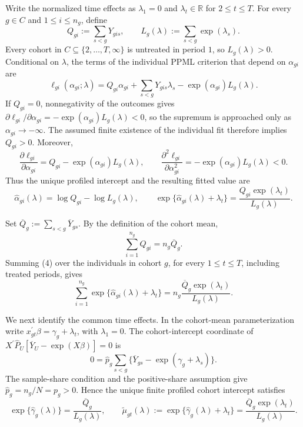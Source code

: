 Write the normalized time effects as \(\lambda _1=0\) and \(\lambda_t\in\mathbb R\) for \(2\le t\le T\).  For every \(g\in C\) and \(1\le i\le n_g\), define
\[
Q_{gi}:=\sum_{s<g}Y_{gis},
\qquad
L_g(\lambda):=\sum_{s<g}\exp(\lambda_s).
\tag{1}
\]
Every cohort in \(C\subseteq\{2,\ldots,T,\infty\}\) is untreated in period \(1\), so \(L_g(\lambda)>0\).  Conditional on \(\lambda\), the terms of the individual PPML criterion that depend on \(\alpha_{gi}\) are
\[
\ell_{gi}(\alpha_{gi};\lambda)
=Q_{gi}\alpha_{gi}
+\sum_{s<g}Y_{gis}\lambda_s
-\exp(\alpha_{gi})L_g(\lambda).
\tag{2}
\]
If \(Q_{gi}=0\), nonnegativity of the outcomes gives
\(\partial\ell_{gi}/\partial\alpha_{gi}=-\exp(\alpha_{gi})L_g(\lambda)<0\), so the supremum is approached only as \(\alpha_{gi}\to-\infty\).  The assumed finite existence of the individual fit therefore implies \(Q_{gi}>0\).  Moreover,
\[
\frac{\partial\ell_{gi}}{\partial\alpha_{gi}}
=Q_{gi}-\exp(\alpha_{gi})L_g(\lambda),
\qquad
\frac{\partial^2\ell_{gi}}{\partial\alpha_{gi}^2}
=-\exp(\alpha_{gi})L_g(\lambda)<0.
\tag{3}
\]
Thus the unique profiled intercept and the resulting fitted value are
\[
\widehat\alpha_{gi}(\lambda)
=\log Q_{gi}-\log L_g(\lambda),
\qquad
\exp\{\widehat\alpha_{gi}(\lambda)+\lambda_t\}
=\frac{Q_{gi}\exp(\lambda_t)}{L_g(\lambda)}.
\tag{4}
\]

Set \(\overline Q_g:=\sum_{s<g}\overline Y_{gs}\).  By the definition of the cohort mean,
\[
\sum_{i=1}^{n_g}Q_{gi}=n_g\overline Q_g.
\tag{5}
\]
Summing (4) over the individuals in cohort \(g\), for every \(1\le t\le T\), including treated periods, gives
\[
\sum_{i=1}^{n_g}
\exp\{\widehat\alpha_{gi}(\lambda)+\lambda_t\}
=n_g\frac{\overline Q_g\exp(\lambda_t)}{L_g(\lambda)}.
\tag{6}
\]

We next identify the common time effects.  In the cohort-mean parameterization write \(x_{gt}^{\prime}\beta=\gamma_g+\lambda_t\), with \(\lambda_1=0\).  The cohort-intercept coordinate of
\(X^{\prime}\widehat P_U[\overline Y_U-\exp(X\beta)]=0\) is
\[
0=\widehat p_g\sum_{s<g}
\{\overline Y_{gs}-\exp(\gamma_g+\lambda_s)\}.
\tag{7}
\]
The sample-share condition and the positive-share assumption give
\(\widehat p_g=n_g/N=p_g>0\).  Hence the unique finite profiled cohort intercept satisfies
\[
\exp\{\widehat\gamma_g(\lambda)\}
=\frac{\overline Q_g}{L_g(\lambda)},
\qquad
\widetilde\mu_{gt}(\lambda)
:=\exp\{\widehat\gamma_g(\lambda)+\lambda_t\}
=\frac{\overline Q_g\exp(\lambda_t)}{L_g(\lambda)}.
\tag{8}
\]

